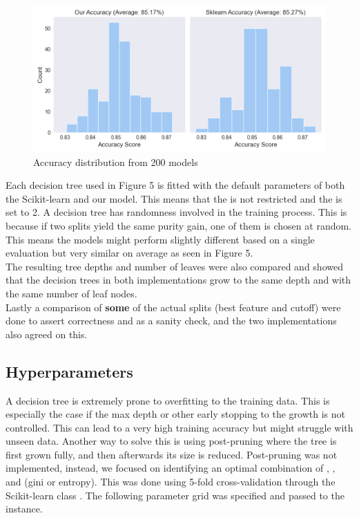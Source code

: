 \begin{figure}[H]
    \centering
    \includegraphics[scale=0.55]{figures_for_report/our_vs_sklearn_accuracy}
    \captionsetup{justification=centering,margin=2cm}
    \caption{Accuracy distribution from 200 models}
\end{figure}

Each decision tree used in Figure 5 is fitted with the default parameters of both the Scikit-learn and our model.
This means that the  is not restricted and the  is set to 2.
A decision tree has randomness involved in the training process.
This is because if two splits yield the same purity gain, one of them is chosen at random.
This means the models might perform slightly different based on a single evaluation but very similar on average as seen in Figure 5.\\

The resulting tree depths and number of leaves were also compared and showed that the decision trees in both implementations grow to the same
depth and with the same number of leaf nodes.
\\

Lastly a comparison of \textbf{some} of the actual splits (best feature and cutoff) were done to assert correctness and as a sanity check, and
the two implementations also agreed on this.\\

\subsection{Hyperparameters}
A decision tree is extremely prone to overfitting to the training data.
This is especially the case if the max depth or other early stopping to the growth is not controlled.
This can lead to a very high training accuracy but might struggle with unseen data.
Another way to solve this is using post-pruning where the tree is first grown fully, and then afterwards its size is reduced.
Post-pruning was not implemented, instead, we focused on identifying an optimal combination of , , and  (gini or entropy).
This was done using 5-fold cross-validation through the Scikit-learn class .
The following parameter grid was specified and passed to the  instance.

